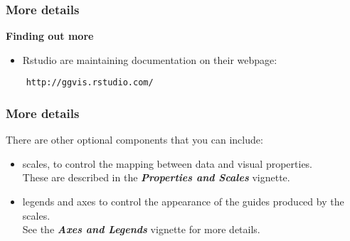 \documentclass[MASTER.tex]{subfiles}
\begin{document}
 
	

\begin{frame}[fragile]
\frametitle{More details}
\Large	
\vspace{-1.6cm}
	\textbf{Finding out more}
	\begin{itemize}
	\item Rstudio are maintaining documentation on their
	webpage:
	\end{itemize}
	\begin{verbatim}
	http://ggvis.rstudio.com/
	\end{verbatim}
\end{frame}
\begin{frame}
\frametitle{More details}
\Large
There are other optional components that you can include:

\begin{itemize}
\item scales, to control the mapping between data and visual properties. \\ These are described in the \textbf{\textit{Properties and Scales }}vignette.

\item legends and axes to control the appearance of the guides produced by the scales. \\ See the \textbf{\textit{Axes and Legends}} vignette for more details.
\end{itemize}
\end{frame}
\end{document}
